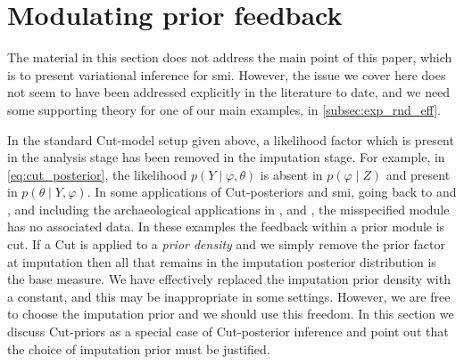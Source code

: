 \section{Modulating prior feedback}\label{sec:prior_feedback}

The material in this section does not address the main point of this paper, which is to present variational inference for \acrshort*{smi}.
However, the issue we cover here does not seem to have been addressed explicitly in the literature to date, and we need some supporting theory for one of our main examples, in \cref{subsec:exp_rnd_eff}.

In the standard Cut-model setup given above, a likelihood factor which is present in the analysis stage has been removed in the imputation stage.
For example, in \cref{eq:cut_posterior}, the likelihood $p(Y \mid \varphi,\theta)$ is absent in $p(\varphi \mid Z)$ and present in $p(\theta \mid Y,\varphi)$.
In some applications of Cut-posteriors and \acrshort*{smi}, going back to \cite{Liu2009modularization} and \cite{Jacob2017together}, and including the archaeological applications in \cite{Styring2017extensification}, \cite{Carmona2020smi} and \cite{Styring2022urban}, the misspecified module has no associated data. In these examples the feedback within a prior module is cut.
If a Cut is applied to a \textit{prior density} and we simply remove the prior factor at imputation then all that remains in the imputation posterior distribution is the base measure.
We have effectively replaced the imputation prior density with a constant, and this may be inappropriate in some settings.
However, we are free to choose the imputation prior and we should use this freedom.
In this section we discuss Cut-priors as a special case of Cut-posterior inference and point out that the choice of imputation prior must be justified.

